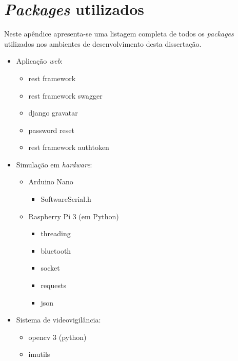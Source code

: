 \chapter{\textit{Packages} utilizados}
\label{packagesAnex}

Neste apêndice apresenta-se uma listagem completa de todos os \textit{packages} utilizados nos ambientes de desenvolvimento desta dissertação. 


\begin{itemize}
	\item Aplicação \textit{web}: 
	
			\begin{itemize}

				\item rest framework
				\item rest framework swagger
				\item django gravatar
				\item password reset
				\item rest framework authtoken

			\end{itemize}
			
	\item Simulação em \textit{hardware}: 
	\begin{itemize}
		\item Arduino Nano 
		
		\begin{itemize}
			\item SoftwareSerial.h
		\end{itemize}
		
		
		\item Raspberry Pi 3 (em Python)
		
		\begin{itemize}
			\item threading
			\item bluetooth
			\item socket
			\item requests
			\item json
		\end{itemize}
		
	\end{itemize}
	
	
	\item Sistema de videovigilância: 
	
	\begin{itemize}
			\item opencv 3 (python)
			\item imutils 
			
	\end{itemize}
	
\end{itemize}